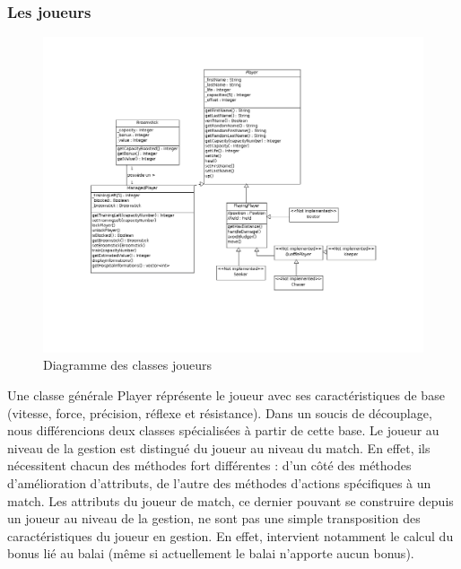 \documentclass[a4paper,titlepage]{scrreprt}
\begin{document}
  \subsubsection{Les joueurs}
    \begin{figure}[H]
    \center
    \includegraphics[scale=0.4]{uml/class/Players.png}
    \caption{Diagramme des classes joueurs}
  \end{figure}	
    Une classe générale Player réprésente le \gls{joueur} avec ses caractéristiques de base (vitesse, force, précision, réflexe et résistance).
    Dans un soucis de découplage, nous différencions deux classes spécialisées à partir de cette base.
    Le joueur au niveau de la gestion est distingué du joueur au niveau du match.
    En effet, ils nécessitent chacun des méthodes fort différentes :
    d'un côté des méthodes d'amélioration d'attributs,
    de l'autre des méthodes d'actions spécifiques à un match.
    Les attributs du joueur de match, ce dernier pouvant se construire depuis un joueur
    au niveau de la gestion, ne sont pas une simple transposition des caractéristiques
    du joueur en gestion. En effet, intervient notamment le calcul du bonus lié au balai (même si actuellement le balai n'apporte aucun bonus).
\end{document}
